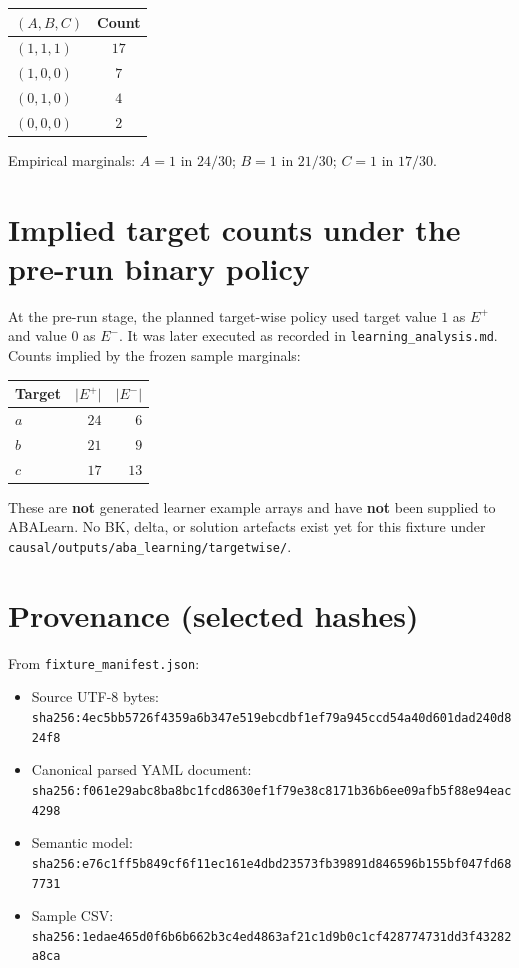 \documentclass[11pt]{article}
\begin{document}
\begin{center}
\begin{tabular}{@{}lc@{}}
\toprule
\((A,B,C)\) & Count \\
\midrule
\((1,1,1)\) & \(17\) \\
\((1,0,0)\) & \(7\) \\
\((0,1,0)\) & \(4\) \\
\((0,0,0)\) & \(2\) \\
\bottomrule
\end{tabular}
\end{center}

Empirical marginals: \(A{=}1\) in \(24/30\); \(B{=}1\) in \(21/30\); \(C{=}1\) in \(17/30\).

\section{Implied target counts under the pre-run binary policy}

At the pre-run stage, the planned target-wise policy used target value \(1\) as
\(E^+\) and value \(0\) as \(E^-\). It was later executed as recorded in
\texttt{learning\_analysis.md}. Counts implied by the frozen sample marginals:

\begin{center}
\begin{tabular}{@{}lrr@{}}
\toprule
Target & \(\lvert E^+\rvert\) & \(\lvert E^-\rvert\) \\
\midrule
\(a\) & \(24\) & \(6\) \\
\(b\) & \(21\) & \(9\) \\
\(c\) & \(17\) & \(13\) \\
\bottomrule
\end{tabular}
\end{center}

These are \textbf{not} generated learner example arrays and have
\textbf{not} been supplied to ABALearn. No BK, delta, or solution artefacts
exist yet for this fixture under
\texttt{causal/outputs/aba\_learning/targetwise/}.

\section{Provenance (selected hashes)}

From \texttt{fixture\_manifest.json}:

\begin{itemize}
  \item Source UTF-8 bytes:
    \texttt{sha256:4ec5bb5726f4359a6b347e519ebcdbf1ef79a945ccd54a40d601dad240d824f8}
  \item Canonical parsed YAML document:
    \texttt{sha256:f061e29abc8ba8bc1fcd8630ef1f79e38c8171b36b6ee09afb5f88e94eac4298}
  \item Semantic model:
    \texttt{sha256:e76c1ff5b849cf6f11ec161e4dbd23573fb39891d846596b155bf047fd687731}
  \item Sample CSV:
    \texttt{sha256:1edae465d0f6b6b662b3c4ed4863af21c1d9b0c1cf428774731dd3f43282a8ca}
\end{itemize}
\end{document}
